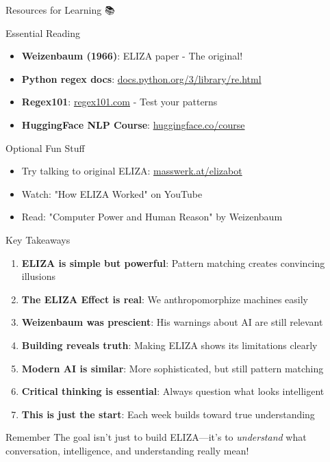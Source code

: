 \documentclass[aspectratio=169]{beamer}
\begin{document}
\begin{frame}[shrink=10]{Resources for Learning 📚}
\small
\begin{block}{Essential Reading}
\begin{itemize}\setlength{\itemsep}{0pt}
    \item \textbf{Weizenbaum (1966)}: ELIZA paper - The original!
    \item \textbf{Python regex docs}: \href{https://docs.python.org/3/library/re.html}{docs.python.org/3/library/re.html}
    \item \textbf{Regex101}: \href{https://regex101.com}{regex101.com} - Test your patterns
    \item \textbf{HuggingFace NLP Course}: \href{https://huggingface.co/course}{huggingface.co/course}
\end{itemize}
\end{block}

\vspace{0.3cm}

\begin{block}{Optional Fun Stuff}
\begin{itemize}\setlength{\itemsep}{0pt}
    \item Try talking to original ELIZA: \href{https://www.masswerk.at/elizabot/}{masswerk.at/elizabot}
    \item Watch: "How ELIZA Worked" on YouTube
    \item Read: "Computer Power and Human Reason" by Weizenbaum
\end{itemize}
\end{block}
\end{frame}

\begin{frame}[shrink=10]{Key Takeaways 🔑}
\begin{enumerate}\setlength{\itemsep}{0pt}
    \item \textbf{ELIZA is simple but powerful}: Pattern matching creates convincing illusions
    \item \textbf{The ELIZA Effect is real}: We anthropomorphize machines easily
    \item \textbf{Weizenbaum was prescient}: His warnings about AI are still relevant
    \item \textbf{Building reveals truth}: Making ELIZA shows its limitations clearly
    \item \textbf{Modern AI is similar}: More sophisticated, but still pattern matching
    \item \textbf{Critical thinking is essential}: Always question what looks intelligent
    \item \textbf{This is just the start}: Each week builds toward true understanding
\end{enumerate}

\vspace{0.3cm}

\begin{alertblock}{Remember}
The goal isn't just to build ELIZA—it's to \textit{understand} what conversation, intelligence, and understanding really mean!
\end{alertblock}
\end{frame}
\end{document}
